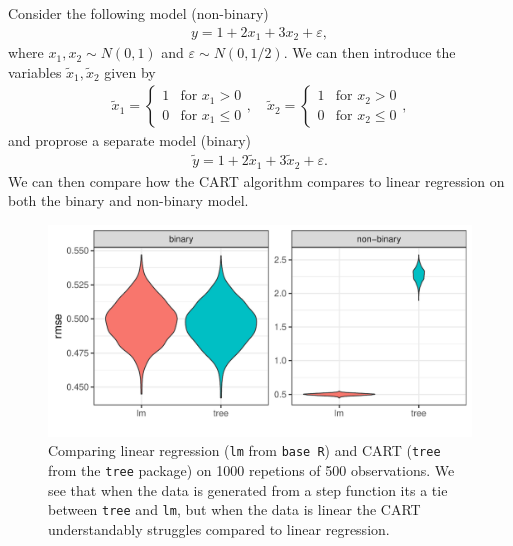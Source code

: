 \documentclass[aspectratio=169,10pt]{beamer}
\begin{document}
\begin{frame}{\secname}{\subsecname}
  Consider the following model (non-binary)
  \begin{align}
    y = 1 + 2x_1 + 3x_2 + \varepsilon,
  \end{align}
  where $x_1, x_2 \sim N(0,1)$ and $\varepsilon \sim N(0,1/2)$.
  We can then introduce the variables $\tilde{x}_1, \tilde{x}_2$ given by
  \begin{align}
    \tilde{x}_1 =
    \begin{cases}
      1 & \text{for } x_1 > 0 \\
      0 & \text{for } x_1 \leq 0
    \end{cases},
    \quad
    \tilde{x}_2 =
    \begin{cases}
      1 & \text{for } x_2 > 0 \\
      0 & \text{for } x_2 \leq 0
    \end{cases},
  \end{align} 
  and proprose a separate model (binary)
  \begin{align}
    \tilde{y} = 1 + 2\tilde{x}_1 + 3\tilde{x}_2 + \varepsilon.
  \end{align}
  We can then compare how the CART algorithm compares to linear regression on both the binary and non-binary model.
\end{frame}

\begin{frame}{\secname}{\subsecname}
  \begin{figure}
    \includegraphics[height=.5\textheight]{scripts/output/lm_tree_compare.pdf}
    \caption{Comparing linear regression (\texttt{lm} from \texttt{base R}) and CART (\texttt{tree} from the \texttt{tree} package) on 1000 repetions of 500 observations.
    We see that when the data is generated from a step function its a tie between \texttt{tree} and \texttt{lm}, but when the data is linear the CART understandably struggles compared to linear regression.}
  \end{figure}
\end{frame}
\end{document}
